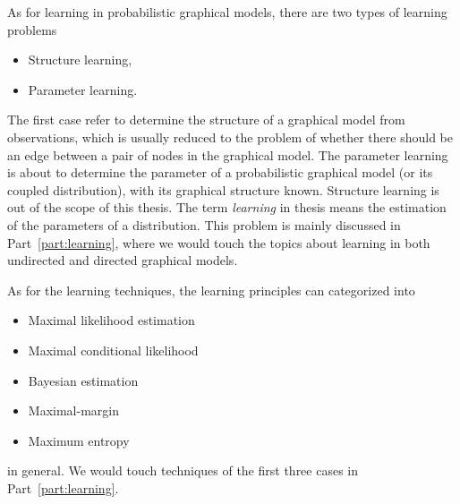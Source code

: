 As for learning in probabilistic graphical models, there are two types of learning problems
\begin{itemize}
\item Structure learning,
\item Parameter learning.
\end{itemize}
The first case refer to determine the structure of a graphical model from observations, which is usually reduced to the problem of whether there should be an edge between a pair of nodes in the graphical model. The parameter learning is about to determine the parameter of a probabilistic graphical model (or its coupled distribution), with its graphical structure known. Structure learning is out of the scope of this thesis. The term \textit{learning} in thesis means the estimation of the parameters of a distribution. This problem is mainly discussed in Part~\ref{part:learning}, where we would touch the topics about learning in both undirected and directed graphical models. 


As for the learning techniques, the learning principles can categorized into
\begin{itemize}
\item Maximal likelihood estimation
\item Maximal conditional likelihood
\item Bayesian estimation
\item Maximal-margin
\item Maximum entropy
\end{itemize}
in general. We would touch techniques of the first three cases in Part~\ref{part:learning}.

